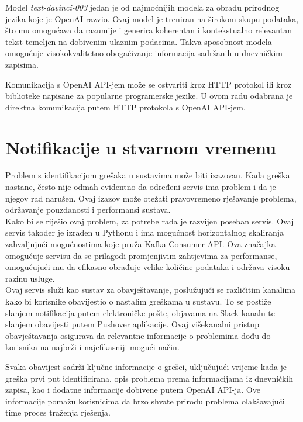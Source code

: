 \documentclass[times, utf8, diplomski]{fer}
\begin{document}
Model \emph{text-davinci-003} jedan je od najmoćnijih modela za obradu prirodnog jezika koje je OpenAI razvio. Ovaj model je treniran na širokom skupu podataka, što mu omogućava da razumije i generira koherentan i kontekstualno relevantan tekst temeljen na dobivenim ulaznim podacima. Takva sposobnost modela omogućuje visokokvalitetno obogaćivanje informacija sadržanih u dnevničkim zapisima.

Komunikacija s OpenAI API-jem može se ostvariti kroz HTTP protokol ili kroz biblioteke napisane za popularne programerske jezike. U ovom radu odabrana je direktna komunikacija putem HTTP protokola s OpenAI API-jem.

\section{Notifikacije u stvarnom vremenu}
\label{sec:notifService}

Problem s identifikacijom grešaka u sustavima može biti izazovan. Kada greška nastane, često nije odmah evidentno da određeni servis ima problem i da je njegov rad narušen. Ovaj izazov može otežati pravovremeno rješavanje problema, održavanje pouzdanosti i performansi sustava.\\

Kako bi se riješio ovaj problem, za potrebe rada je razvijen poseban servis. Ovaj servis također je izrađen u Pythonu i ima mogućnost horizontalnog skaliranja zahvaljujući mogućnostima koje pruža Kafka Consumer API. Ova značajka omogućuje servisu da se prilagodi promjenjivim zahtjevima za performanse, omogućujući mu da efikasno obrađuje velike količine podataka i održava visoku razinu usluge.\\

Ovaj servis služi kao sustav za obavještavanje, poslužujući se različitim kanalima kako bi korisnike obavijestio o nastalim greškama u sustavu. To se postiže slanjem notifikacija putem elektroničke pošte, objavama na Slack kanalu te slanjem obavijesti putem Pushover aplikacije. Ovaj višekanalni pristup obavještavanja osigurava da relevantne informacije o problemima dođu do korisnika na najbrži i najefikasniji mogući način.

Svaka obavijest sadrži ključne informacije o grešci, uključujući vrijeme kada je greška prvi put identificirana, opis problema prema informacijama iz dnevničkih zapisa, kao i dodatne informacije dobivene putem OpenAI API-ja. Ove informacije pomažu korisnicima da brzo shvate prirodu problema olakšavajući time proces traženja rješenja.\\
\end{document}

